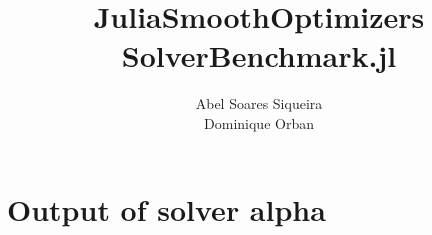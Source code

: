 \documentclass[12pt]{article}
\title{
	JuliaSmoothOptimizers \\ SolverBenchmark.jl
}
\author{
	Abel Soares Siqueira \\ Dominique Orban
}
\date{ }
\begin{document}
\maketitle

\section*{Output of solver alpha}


\end{document}

